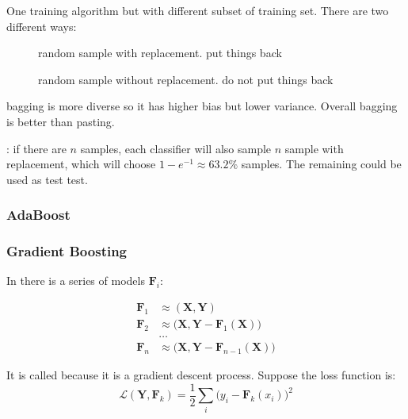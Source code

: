 One training algorithm but with different subset of training set. There are two different ways:

\begin{description}
	\item [] random sample with replacement. put things back
	\item [] random sample without replacement. do not put things back
\end{description}

bagging is more diverse so it has higher bias but lower variance. Overall bagging is better than pasting.

: if there are $n$ samples, each classifier will also sample $n$ sample with replacement, which will choose $1 - e^{-1} \approx 63.2\%$ samples. The remaining could be used as test test.


\subsubsection{AdaBoost}


\subsubsection{Gradient Boosting}

In  there is a series of models $\mathbf{F}_i$:

\begin{equation}
	\begin{aligned}
		\mathbf{F}_1 &\approx (\mathbf{X},\mathbf{Y}) \\
		\mathbf{F}_2 &\approx \Big(\mathbf{X},\mathbf{Y} - \mathbf{F}_1 (\mathbf{X}) \Big ) \\
		&\dots \\
		\mathbf{F}_n &\approx \Big(\mathbf{X},\mathbf{Y} - \mathbf{F}_{n-1} (\mathbf{X}) \Big )
	\end{aligned}
\end{equation}

It is called  because it is a gradient descent process. Suppose the loss function is:
\begin{equation}
	\mathcal{L}(\mathbf{Y},\mathbf{F}_k) = \frac{1}{2} \sum_i \Big ( y_i - \mathbf{F}_k (x_i) \Big )^2
\end{equation}

